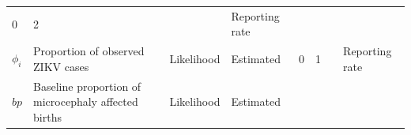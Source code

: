 \documentclass[10pt,letterpaper]{article}
\begin{document}
\begin{longtable}[]{@{}llllllll@{}}
\begin{minipage}[t]{0.04\columnwidth}
0\strut
\end{minipage} & \begin{minipage}[t]{0.04\columnwidth}\raggedright\strut
2\strut
\end{minipage} & \begin{minipage}[t]{0.14\columnwidth}\raggedright\strut
\strut
\end{minipage} & \begin{minipage}[t]{0.26\columnwidth}\raggedright\strut
Reporting rate\strut
\end{minipage}\tabularnewline
\begin{minipage}[t]{0.04\columnwidth}\raggedright\strut
\(\phi_i\)\strut
\end{minipage} & \begin{minipage}[t]{0.17\columnwidth}\raggedright\strut
Proportion of observed ZIKV cases\strut
\end{minipage} & \begin{minipage}[t]{0.05\columnwidth}\raggedright\strut
Likelihood\strut
\end{minipage} & \begin{minipage}[t]{0.05\columnwidth}\raggedright\strut
Estimated\strut
\end{minipage} & \begin{minipage}[t]{0.04\columnwidth}\raggedright\strut
0\strut
\end{minipage} & \begin{minipage}[t]{0.04\columnwidth}\raggedright\strut
1\strut
\end{minipage} & \begin{minipage}[t]{0.14\columnwidth}\raggedright\strut
\strut
\end{minipage} & \begin{minipage}[t]{0.26\columnwidth}\raggedright\strut
Reporting rate\strut
\end{minipage}\tabularnewline
\begin{minipage}[t]{0.04\columnwidth}\raggedright\strut
\(bp\)\strut
\end{minipage} & \begin{minipage}[t]{0.17\columnwidth}\raggedright\strut
Baseline proportion of microcephaly affected births\strut
\end{minipage} & \begin{minipage}[t]{0.05\columnwidth}\raggedright\strut
Likelihood\strut
\end{minipage} & \begin{minipage}[t]{0.05\columnwidth}\raggedright\strut
Estimated\strut

\end{minipage}
\end{longtable}
\end{document}
